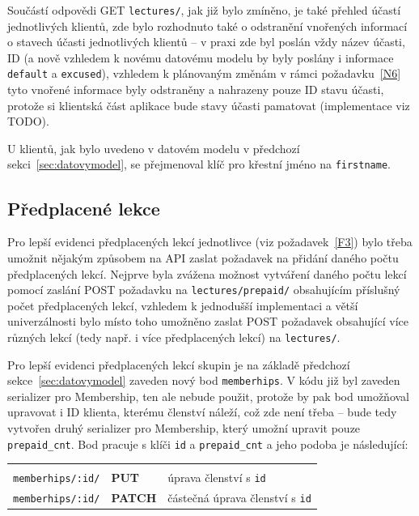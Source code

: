Součástí odpovědi GET \verb|lectures/|, jak již bylo zmíněno, je také přehled účastí jednotlivých klientů, zde bylo rozhodnuto také o odstranění vnořených informací o stavech účasti jednotlivých klientů -- v praxi zde byl poslán vždy název účasti, ID (a nově vzhledem k novému datovému modelu by byly poslány i informace \verb|default| a \verb|excused|), vzhledem k plánovaným změnám v rámci požadavku~\ref{N6} tyto vnořené informace byly odstraněny a nahrazeny pouze ID stavu účasti, protože si klientská část aplikace bude stavy účasti pamatovat (implementace viz TODO).

U klientů, jak bylo uvedeno v datovém modelu v předchozí sekci~\ref{sec:datovymodel}, se přejmenoval klíč pro křestní jméno na \verb|firstname|.
    
\newcommand{\apiA}{0.33}
\newcommand{\apiB}{0.14}
\newcommand{\apiC}{0.43}

\subsection{Předplacené lekce}

Pro lepší evidenci předplacených lekcí jednotlivce (viz požadavek~\ref{F3}) bylo třeba umožnit nějakým způsobem na API zaslat požadavek na přidání daného počtu předplacených lekcí. Nejprve byla zvážena možnost vytváření daného počtu lekcí pomocí zaslání POST požadavku na \verb|lectures/prepaid/| obsahujícím příslušný počet předplacených lekcí, vzhledem k jednodušší implementaci a větší univerzálnosti bylo místo toho umožněno zaslat POST požadavek obsahující více různých lekcí (tedy např. i více předplacených lekcí) na \verb|lectures/|.

Pro lepší evidenci předplacených lekcí skupin je na základě předchozí sekce~\ref{sec:datovymodel} zaveden nový bod \verb|memberhips|. V kódu již byl zaveden serializer pro Membership, ten ale nebude použit, protože by pak bod umožňoval upravovat i ID klienta, kterému členství náleží, což zde není třeba -- bude tedy vytvořen druhý serializer pro Membership, který umožní upravit pouze \verb|prepaid_cnt|. Bod pracuje s klíči \verb|id| a \verb|prepaid_cnt| a jeho podoba je následující:

{\centering
\begin{tabular}{p{\apiA\textwidth} p{\apiB\textwidth} p{\apiC\textwidth}}&&\\
    \verb|memberhips/:id/|     & \textbf{PUT}      & úprava členství s \verb|id|\\
    \verb|memberhips/:id/|     & \textbf{PATCH}    & částečná úprava členství s \verb|id|\\
\end{tabular}}

